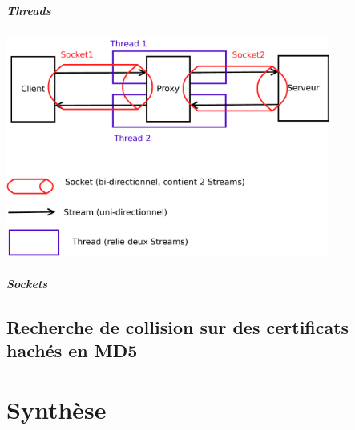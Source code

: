 \documentclass[a4paper,11pt,french]{report}
\begin{document}
\paragraph{Threads}
\includegraphics[width=0.8\textwidth]{images/thread.pdf}

\paragraph{Sockets}


\section{Recherche de collision sur des certificats hachés en MD5}

\chapter{Synthèse}
\end{document}
